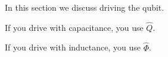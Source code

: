 
In this section we discuss driving the qubit.


If you drive with capacitance, you use $\hat{Q}$.


If you drive with inductance, you use $\hat{\Phi}$.

